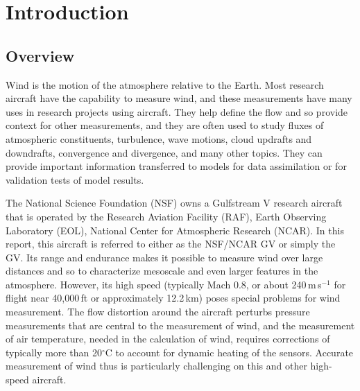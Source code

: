 \documentclass[12pt,twoside,english]{article}\usepackage[]{graphicx}\usepackage[]{color}
\let\stdsection\section
\renewcommand{\section}{\newpage\stdsection}
\let\OrgIndex\index
\renewcommand*{\index}[1]{\OrgIndex{#1}}
\begin{document}



\section{Introduction}

\subsection{Overview}

Wind is the motion of the atmosphere relative to the Earth. Most research aircraft have the capability to measure wind, and these measurements have many uses in research projects using aircraft. They help define the flow and so provide context for other measurements, and they are often used to study fluxes of atmospheric constituents, turbulence, wave motions, cloud updrafts and downdrafts, convergence and divergence, and many other topics. They can provide important information transferred to models for data assimilation or for validation tests of model results. 


The National Science Foundation (NSF) owns a Gulfstream V research aircraft that is operated by the Research Aviation Facility (RAF), Earth Observing Laboratory (EOL), National Center for Atmospheric Research (NCAR). In this report, this aircraft is referred to either as the NSF/NCAR GV or simply the GV. Its range and endurance makes it possible to measure wind over large distances and so to characterize mesoscale and even larger features in the atmosphere. However, its high speed (typically Mach 0.8, or about 240\,m\,s$^{-1}$ for flight near 40,000\,ft or approximately 12.2\,km) poses special problems for wind measurement. The flow distortion around the aircraft perturbs pressure measurements that are central to the measurement of wind, and the measurement of air temperature, needed in the calculation of wind, requires corrections of typically more than 20$^{\circ}$C to account for dynamic heating of the sensors. Accurate measurement of wind thus is particularly challenging on this and other high-speed aircraft. 
\end{document}

